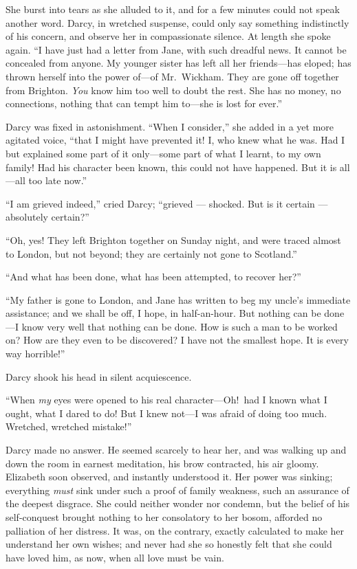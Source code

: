\documentclass[12pt,english]{book}
\begin{document}
She burst into tears as she alluded to it, and for a few minutes could
not speak another word. Darcy, in wretched suspense, could only say
something indistinctly of his concern, and observe her in compassionate
silence. At length she spoke again. {}``I have just had a letter
from Jane, with such dreadful news. It cannot be concealed from anyone.
My younger sister has left all her friends\mbox{---}has eloped; has
thrown herself into the power of\mbox{---}of Mr.\ Wickham. They
are gone off together from Brighton. \textit{You} know him too well
to doubt the rest. She has no money, no connections, nothing that
can tempt him to\mbox{---}she is lost for ever.''

Darcy was fixed in astonishment. {}``When I consider,'' she added
in a yet more agitated voice, {}``that I might have prevented it!
I, who knew what he was. Had I but explained some part of it only\mbox{---}some
part of what I learnt, to my own family! Had his character been known,
this could not have happened. But it is all\mbox{---}all too late
now.''

{}``I am grieved indeed,'' cried Dar\-cy; {}``grieved \mbox{---}
shocked. But is it certain \mbox{---} absolutely certain?''\ 

{}``Oh, yes! They left Brighton together on Sunday night, and were
traced almost to London, but not beyond; they are certainly not gone
to Scotland.''

{}``And what has been done, what has been attempted, to recover her?''\ 

{}``My father is gone to London, and Jane has written to beg my uncle's
immediate assistance; and we shall be off, I hope, in half-an-hour.
But nothing can be done\mbox{---}I know very well that nothing can
be done. How is such a man to be worked on? How are they even to be
discovered? I have not the smallest hope. It is every way horrible!''\ 

Darcy shook his head in silent acquiescence.

{}``When \textit{my} eyes were opened to his real character\mbox{---}Oh!\ had
I known what I ought, what I dared to do! But I knew not\mbox{---}I
was afraid of doing too much. Wretched, wretched mistake!''\ 

Darcy made no answer. He seemed scarcely to hear her, and was walking
up and down the room in earnest meditation, his brow contracted, his
air gloomy. Elizabeth soon observed, and instantly understood it.
Her power was sinking; everything \textit{must} sink under such a
proof of family weakness, such an assurance of the deepest disgrace.
She could neither wonder nor condemn, but the belief of his self-conquest
brought nothing to her consolatory to her bosom, afforded no palliation
of her distress. It was, on the contrary, exactly calculated to make
her understand her own wishes; and never had she so honestly felt
that she could have loved him, as now, when all love must be vain.
\end{document}

